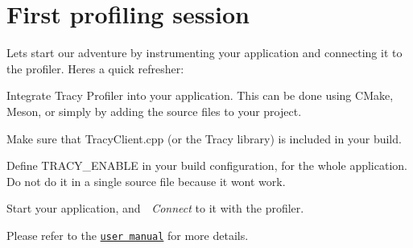 \chapter{First profiling session }
\hypertarget{md__mono_engine_2thirdparty_2tracy_2profiler_2src_2achievements_2_connect_to_client}{}\label{md__mono_engine_2thirdparty_2tracy_2profiler_2src_2achievements_2_connect_to_client}
\label{md__mono_engine_2thirdparty_2tracy_2profiler_2src_2achievements_2_connect_to_client_autotoc_md1104}%
%


Let\textquotesingle{}s start our adventure by instrumenting your application and connecting it to the profiler. Here\textquotesingle{}s a quick refresher:\+


\begin{DoxyEnumerate}
\item Integrate Tracy Profiler into your application. This can be done using CMake, Meson, or simply by adding the source files to your project.
\item Make sure that {\ttfamily Tracy\+Client.\+cpp} (or the Tracy library) is included in your build.
\item Define {\ttfamily TRACY\+\_\+\+ENABLE} in your build configuration, for the whole application. Do not do it in a single source file because it won\textquotesingle{}t work.
\item Start your application, and {\itshape  Connect} to it with the profiler.
\end{DoxyEnumerate}

Please refer to the \href{https://github.com/wolfpld/tracy/releases}{\texttt{user manual}} for more details. 